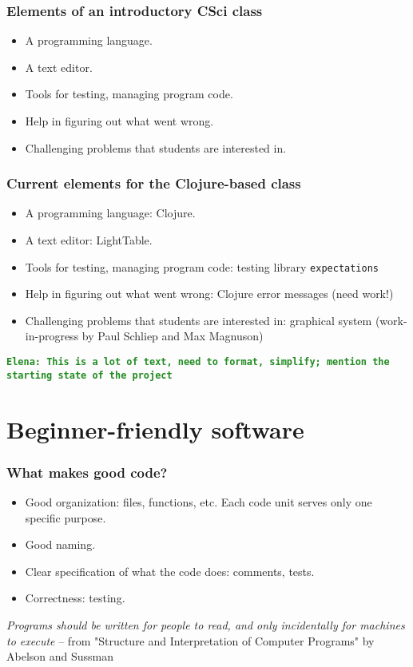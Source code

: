 \documentclass{beamer}
\newcommand{\comment}[1]{{\bf \tt  {#1}}}
\newcommand{\emcomment}[1]{\textcolor{ForestGreen}{\comment{Elena: {#1}}}}
\begin{document}
\begin{frame}[fragile]
\frametitle{Elements of an introductory CSci class}
\begin{itemize}
\item A programming language. 
\item A text editor.
\item Tools for testing, managing program code. 
\item Help in figuring out what went wrong.
\item Challenging problems that students are interested in.
\end{itemize}
\end{frame}

\begin{frame}[fragile]
\frametitle{Current elements for the Clojure-based class}
\begin{itemize}
\item A programming language: Clojure. 
\item A text editor: LightTable.
\item Tools for testing, managing program code: testing library {\tt expectations}
\item Help in figuring out what went wrong: Clojure error messages (need work!)
\item Challenging problems that students are interested in: graphical system (work-in-progress by Paul Schliep and Max Magnuson)
\end{itemize}
\emcomment{This is a lot of text, need to format, simplify; mention the starting state of the project}
\end{frame}

\section{Beginner-friendly software}

\begin{frame}[fragile]
\frametitle{What makes good code?}

\begin{itemize}
\item Good organization: files, functions, etc. Each code unit serves only one specific purpose. 
\item Good naming.
\item Clear specification of what the code does: comments, tests.
\item Correctness: testing. 
\end{itemize}
{\it Programs should be written for people to read, and only incidentally for machines to execute} --	 
from "Structure and Interpretation of Computer Programs" by Abelson and Sussman	
\end{frame}
\end{document}
